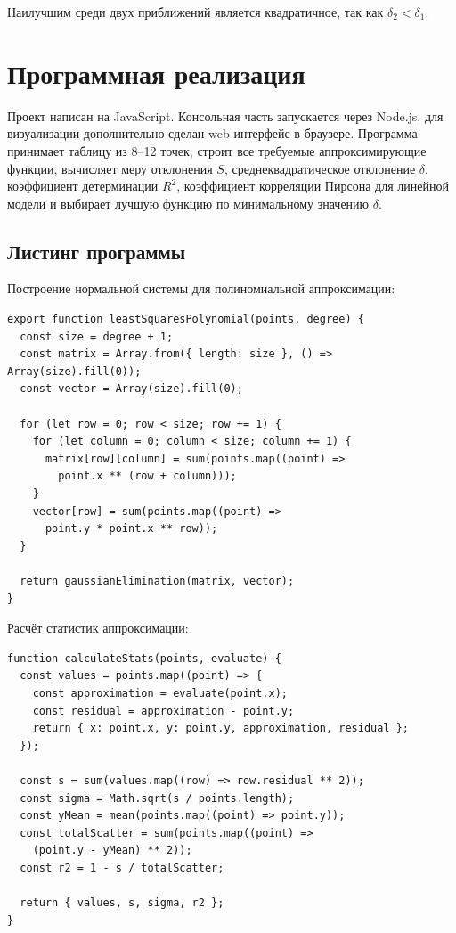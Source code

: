 \documentclass[12pt,a4paper]{article}
\begin{document}
Наилучшим среди двух приближений является квадратичное, так как
$\delta_2<\delta_1$.

\section{Программная реализация}

Проект написан на JavaScript. Консольная часть запускается через Node.js, для визуализации
дополнительно сделан web-интерфейс в браузере. Программа принимает таблицу из 8--12 точек,
строит все требуемые аппроксимирующие функции, вычисляет меру отклонения $S$,
среднеквадратическое отклонение $\delta$, коэффициент детерминации $R^2$, коэффициент
корреляции Пирсона для линейной модели и выбирает лучшую функцию по минимальному
значению $\delta$.

\subsection{Листинг программы}

Построение нормальной системы для полиномиальной аппроксимации:

\begin{lstlisting}
export function leastSquaresPolynomial(points, degree) {
  const size = degree + 1;
  const matrix = Array.from({ length: size }, () => Array(size).fill(0));
  const vector = Array(size).fill(0);

  for (let row = 0; row < size; row += 1) {
    for (let column = 0; column < size; column += 1) {
      matrix[row][column] = sum(points.map((point) =>
        point.x ** (row + column)));
    }
    vector[row] = sum(points.map((point) =>
      point.y * point.x ** row));
  }

  return gaussianElimination(matrix, vector);
}
\end{lstlisting}

Расчёт статистик аппроксимации:

\begin{lstlisting}
function calculateStats(points, evaluate) {
  const values = points.map((point) => {
    const approximation = evaluate(point.x);
    const residual = approximation - point.y;
    return { x: point.x, y: point.y, approximation, residual };
  });

  const s = sum(values.map((row) => row.residual ** 2));
  const sigma = Math.sqrt(s / points.length);
  const yMean = mean(points.map((point) => point.y));
  const totalScatter = sum(points.map((point) =>
    (point.y - yMean) ** 2));
  const r2 = 1 - s / totalScatter;

  return { values, s, sigma, r2 };
}
\end{lstlisting}
\end{document}
